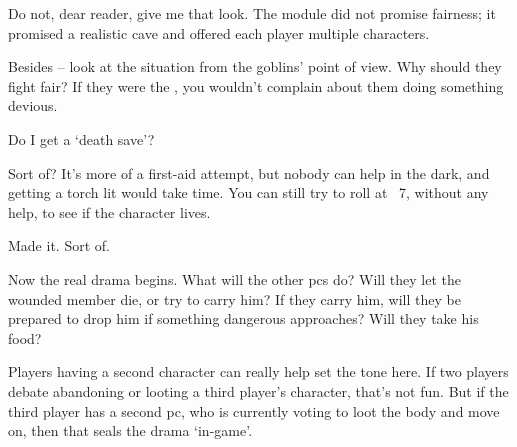 \begin{multicols}{2}
\bigLine
\vspace{2em}
\noindent
Do not, dear reader, give me that look.
The module did not promise fairness; it promised a realistic cave and offered each player multiple characters.

Besides -- look at the situation from the goblins' point of view.
Why should they fight fair?
If they were the , you wouldn't complain about them doing something devious.

\bigLine

\null
\begin{description}\sf
  \item[Player 3:]
  Do I get a `death save'?
  \item[\Glsentrytext{gm}:]
  Sort of?
  It's more of a first-aid attempt, but nobody can help in the dark, and getting a torch lit would take time.
  You can still try to roll at ~7, without any help, to see if the character lives.
  \item[Player 3:]
  Made it.
  Sort of.
\end{description}

\bigLine
\vspace{2em}

\noindent
Now the real drama begins.
What will the other \glspl{pc} do?
Will they let the wounded member die, or try to carry him?
If they carry him, will they be prepared to drop him if something dangerous approaches?
Will they take his food?

Players having a second character can really help set the tone here.
If two players debate abandoning or looting a third player's character, that's not fun.
But if the third player has a second \gls{pc}, who is currently voting to loot the body and move on, then that seals the drama `in-game'.

\end{multicols}
